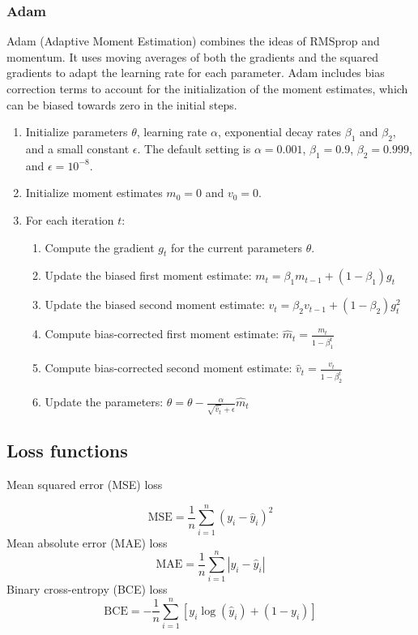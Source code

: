 \subsubsection{Adam}
Adam (Adaptive Moment Estimation) combines the ideas of RMSprop and momentum. It uses moving averages of both the gradients and the squared gradients to adapt the learning rate for each parameter. Adam includes bias correction terms to account for the initialization of the moment estimates, which can be biased towards zero in the initial steps. \cite{kingma2014adam}
\begin{enumerate}
	\item Initialize parameters $\theta$, learning rate $\alpha$, exponential decay rates $\beta_1$ and $\beta_2$, and a small constant $\epsilon$. The default setting is $\alpha = 0.001$, $\beta_1 = 0.9$, $\beta_2 = 0.999$, and $\epsilon = 10^{-8}$.
	\item Initialize moment estimates $m_0 = 0$ and $v_0 = 0$.
	\item For each iteration $t$:
	\begin{enumerate}
		\item Compute the gradient $g_t$ for the current parameters $\theta$.
		\item Update the biased first moment estimate: $m_t = \beta_1 m_{t-1} + (1 - \beta_1) g_t$
		\item Update the biased second moment estimate: $v_t = \beta_2 v_{t-1} + (1 - \beta_2) g_t^2$
		\item Compute bias-corrected first moment estimate: $\hat{m}_t = \frac{m_t}{1 - \beta_1^t}$
		\item Compute bias-corrected second moment estimate: $\hat{v}_t = \frac{v_t}{1 - \beta_2^t}$
		\item Update the parameters: $\theta = \theta - \frac{\alpha}{\sqrt{\hat{v}_t} + \epsilon} \hat{m}_t$
	\end{enumerate}
\end{enumerate}


\subsection{Loss functions}
Mean squared error (MSE) loss

\begin{equation}
	\mathrm{MSE}=\frac{1}{n} \sum_{i=1}^n\left(y_i-\hat{y}_i\right)^2
	\label{eq:mse_loss}
\end{equation}
Mean absolute error (MAE) loss
\begin{equation}
	\mathrm{MAE}=\frac{1}{n} \sum_{i=1}^n\left|y_i-\hat{y}_i\right|
	\label{eq:mae_loss}
\end{equation}
Binary cross-entropy (BCE) loss
\begin{equation}
	\mathrm{BCE}=-\frac{1}{n} \sum_{i=1}^n\left[y_i \log \left(\hat{y}_i\right)+\left(1-y_i\right)\right]
	\label{eq:bce_loss}
\end{equation}

